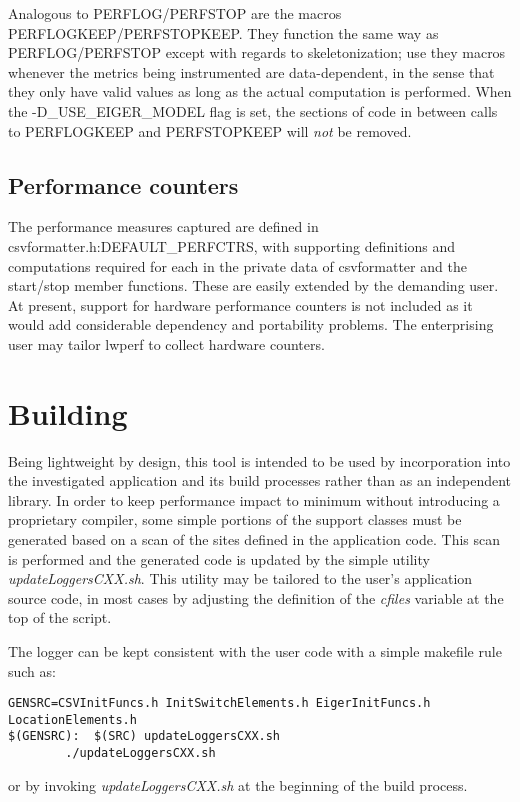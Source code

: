 \documentclass{article}
\begin{document}
Analogous to PERFLOG/PERFSTOP are the macros PERFLOGKEEP/PERFSTOPKEEP. They function the same way as PERFLOG/PERFSTOP except with regards to skeletonization; use they macros whenever the metrics being instrumented are data-dependent, in the sense that they only have valid values as long as the actual computation is performed. When the -D\_USE\_EIGER\_MODEL flag is set, the sections of code in between calls to PERFLOGKEEP and PERFSTOPKEEP will \textit{not} be removed.

\subsection{Performance counters}
The performance measures captured are defined in csvformatter.h:DEFAULT\_PERFCTRS, with supporting definitions and computations required for each in the private data of csvformatter and the start/stop member functions. These are easily extended by the demanding user. At present, support for hardware performance counters is not included as it would add considerable dependency and portability problems. The enterprising user may tailor lwperf to collect hardware counters.


\section{Building}
Being lightweight by design, this tool is intended to be used by incorporation into the investigated application and its build processes rather than as an independent library.  In order to keep performance impact to minimum without introducing a proprietary compiler, some simple portions of the support classes must be generated based on a scan of the sites defined in the application code. This scan is performed and the generated code is updated by the simple utility {\em updateLoggersCXX.sh}. This utility may be tailored to the user's application source code, in most cases by adjusting the definition of the {\em cfiles} variable at the top of the script.

The logger can be kept consistent with the user code with a simple makefile rule such as:
\begin{verbatim}
GENSRC=CSVInitFuncs.h InitSwitchElements.h EigerInitFuncs.h LocationElements.h
$(GENSRC):  $(SRC) updateLoggersCXX.sh
        ./updateLoggersCXX.sh
\end{verbatim}
or by invoking {\em updateLoggersCXX.sh} at the beginning of the build process.
\end{document}

